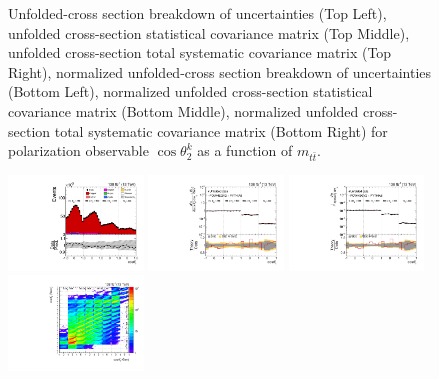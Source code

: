 \begin{figure}[htb]
\begin{center}
\caption{Unfolded-cross section breakdown of uncertainties (Top Left), unfolded cross-section statistical covariance matrix (Top Middle), unfolded cross-section total systematic covariance matrix (Top Right), normalized unfolded-cross section breakdown of uncertainties (Bottom Left), normalized unfolded cross-section statistical covariance matrix (Bottom Middle), normalized unfolded cross-section total systematic covariance matrix (Bottom Right) for polarization observable $\cos\theta_{2}^{k}$ as a function of $m_{t\bar{t}}$.}
\label{fig:b2k_mttbar_uncertainties}
\end{center}
\end{figure}
\clearpage
\begin{figure}[htb]
\begin{center}
 \includegraphics[width=0.32\textwidth]{fig_fullRun2UL/controlplots/combined/Hyp_AntiLeptonBr_vs_TTBarMass.pdf}
 \includegraphics[width=0.32\textwidth]{fig_fullRun2UL/unfolding/combined/UnfoldedResults_b1r_mttbar.pdf}
 \includegraphics[width=0.32\textwidth]{fig_fullRun2UL/unfolding/combined/UnfoldedResultsNorm_b1r_mttbar.pdf} \\
 \includegraphics[width=0.32\textwidth]{fig_fullRun2UL/unfolding/combined/ResponseMatrix_b1r_mttbar.pdf}

\end{center}
\end{figure}
